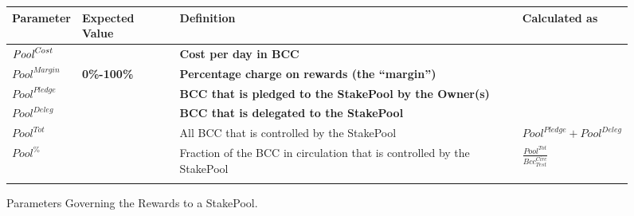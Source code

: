 \documentclass[11pt,a4paper,dvipsnames,twosided,final]{article}
\newcommand{\bcc}{BCC{}}
\newcommand{\bcc}[1]{Bcc}
\begin{document}
\begin{figure}[h!]
\begin{center}
\begin{tabular}{||l|l|p{6cm}|l||}
  \hline \hline
\textbf{Parameter} & \textbf{Expected Value} & \textbf{Definition} & \textbf{Calculated as} \\\hline
  \textbf{\color{red} $\textit{\textit{Pool}}^{\textit{Cost}}$} &  & \textbf{\color{red} Cost per day in \bcc{}} & \\\hline
\textbf{\color{red} ${\textit{Pool}}^{\textit{Margin}}$} &  \textbf{\color{red} 0\%-100\%} & \textbf{\color{red} Percentage charge on rewards (the ``margin'')} & \\\hline
\textbf{\color{red} ${\textit{Pool}}^\textit{Pledge}$} & & \textbf{\color{red} \bcc{} that is pledged to the StakePool by the Owner(s)} & \\\hline
\textbf{\color{blue} ${\textit{Pool}}^\textit{Deleg}$} & & \textbf{\color{blue} \bcc{} that is delegated to the StakePool} & \\\hline
${\textit{Pool}}^{Tot}$ & & All \bcc{} that is controlled by the StakePool & ${\textit{Pool}}^\textit{Pledge} + {\textit{Pool}}^\textit{Deleg}$ \\\hline
  ${\textit{Pool}}^\%$ & & Fraction of the \bcc{} in circulation that is controlled by the StakePool & {\large $\frac{{\textit{Pool}}^{Tot}}{\textit{Bcc}^{\textit{Circ}}_{\textit{Test}}}$} \\\hline
&&&  \\\hline
\hline
\end{tabular}
\end{center}
\caption{Parameters Governing the Rewards to a StakePool.}
\label{fig:rewards}
\end{figure}
\end{document}
